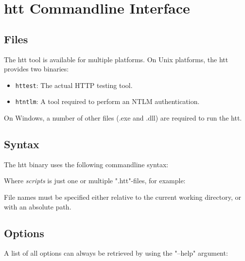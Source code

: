 \chapter{htt Commandline Interface}
\label{chap:commandline}

\section{Files}

The htt tool is available for multiple platforms. On Unix platforms, the htt 
provides two binaries:

\begin{itemize}
 \item \texttt{httest}: The actual HTTP testing tool.
 \item \texttt{htntlm}: A tool required to perform an NTLM authentication.
\end{itemize}

On Windows, a number of other files (.exe and .dll) are required to run the htt.

\section{Syntax}

The htt binary uses the following commandline syntax:

\begin{usplisting}
\end{usplisting}

Where \textit{scripts} is just one or multiple ".htt"-files, for example:

\begin{usplisting}
\end{usplisting}

File names must be specified either relative to the current working 
directory, or with an absolute path.
\newpage 
\section{Options}

A list of all options can always be retrieved by using the "--help" argument:


